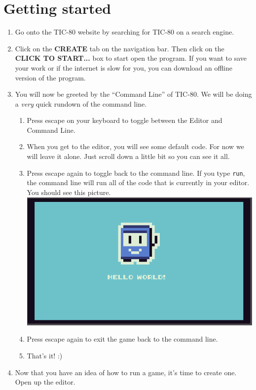 \documentclass[10pt, twocolumn]{article}
\begin{document}
\section{Getting started}
\begin{enumerate}
	\item Go onto the TIC-80 website by searching for TIC-80 on a search engine.
	\item Click on the \textbf{CREATE} tab on the navigation bar. Then click on the \textbf{CLICK TO START...} box to start open the program. If you want to save your work or if the internet is slow for you, you can download an offline version of the program.
	\item You will now be greeted by the ``Command Line'' of TIC-80. We will be doing a \textit{very} quick rundown of the command line.
	\begin{enumerate}
		\item Press escape on your keyboard to toggle between the Editor and Command Line.
		\item When you get to the editor, you will see some default code. For now we will leave it alone. Just scroll down a little bit so you can see it all.
		\item Press escape again to toggle back to the command line. If you type \lstinline{run}, the command line will run all of the code that is currently in your editor. You should see this picture.
		\includegraphics[width=1\linewidth]{default_game.png}
		\item Press escape again to exit the game back to the command line.
		\item That's it! :)
	\end{enumerate}
	\item Now that you have an idea of how to run a game, it's time to create one. Open up the editor.
\end{enumerate}
\end{document}
